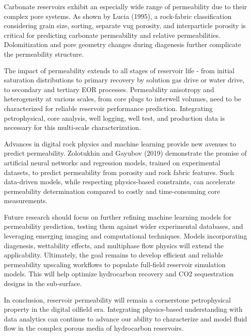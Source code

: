 \documentclass[journal]{IEEEtran}
\begin{document}
Carbonate reservoirs exhibit an especially wide range of permeability due to their complex pore systems. As shown by Lucia (1995), a rock-fabric classification considering grain size, sorting, separate vug porosity, and interparticle porosity is critical for predicting carbonate permeability and relative permeabilities. Dolomitization and pore geometry changes during diagenesis further complicate the permeability structure.

The impact of permeability extends to all stages of reservoir life - from initial saturation distributions to primary recovery by solution gas drive or water drive, to secondary and tertiary EOR processes. Permeability anisotropy and heterogeneity at various scales, from core plugs to interwell volumes, need to be characterized for reliable reservoir performance prediction. Integrating petrophysical, core analysis, well logging, well test, and production data is necessary for this multi-scale characterization.

Advances in digital rock physics and machine learning provide new avenues to predict permeability. Zolotukhin and Gayubov (2019) demonstrate the promise of artificial neural networks and regression models, trained on experimental datasets, to predict permeability from porosity and rock fabric features. Such data-driven models, while respecting physics-based constraints, can accelerate permeability determination compared to costly and time-consuming core measurements.

Future research should focus on further refining machine learning models for permeability prediction, testing them against wider experimental databases, and leveraging emerging imaging and computational techniques. Models incorporating diagenesis, wettability effects, and multiphase flow physics will extend the applicability. Ultimately, the goal remains to develop efficient and reliable permeability upscaling workflows to populate full-field reservoir simulation models. This will help optimize hydrocarbon recovery and CO2 sequestration designs in the sub-surface.

In conclusion, reservoir permeability will remain a cornerstone petrophysical property in the digital oilfield era. Integrating physics-based understanding with data analytics can continue to advance our ability to characterize and model fluid flow in the complex porous media of hydrocarbon reservoirs.

\newpage
\printbibliography
\end{document}
